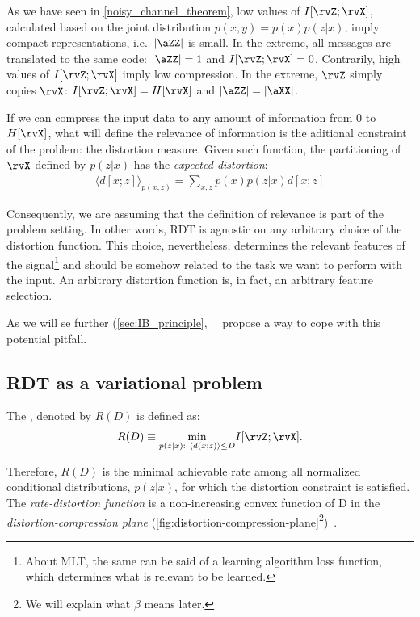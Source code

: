 As we have seen in \ref{noisy_channel_theorem}, low values of $I[\rvZ;\rvX]$, calculated based on the joint distribution $p(x,y)=p(x)p(z|x)$, imply compact representations, i.e.\ $|\aZZ|$ is small. In the extreme, all messages are translated to the same code: $|\aZZ|=1$ and $I[\rvZ;\rvX]=0$. Contrarily, high values of $I[\rvZ;\rvX]$ imply low compression.  In the extreme, $\rvZ$ simply copies $\rvX$: $I[\rvZ;\rvX]=H[\rvX]$ and $|\aZZ|=|\aXX|$.

If we can compress the input data to any amount of information from $0$ to $H[\rvX]$, what will define the relevance of information is the aditional constraint of the problem: the distortion measure. Given such function, the partitioning of $\rvX$ defined by $p(z|x)$ has the \emph{expected distortion}:
\begin{align}
	\langle d[x;z] \rangle _{p(x,z)} = \sum_{x,z} p(x) p(z|x) d[x;z]
\end{align}

Consequently, we are assuming that the definition of relevance is part of the problem setting. In other words, \ac{RDT} is agnostic on any arbitrary choice of the distortion function. This choice, nevertheless, determines the relevant features of the signal\footnote{About MLT, the same can be said of a learning algorithm loss function, which determines what is relevant to be learned.} and should be somehow related to the task we want to perform with the input. An arbitrary distortion function is, in fact, an arbitrary feature selection\cite{tishby:1999}.

As we will se further (\ref{sec:IB_principle},~\citeauthor{tishby:1999}~\cite{tishby:1999} propose a way to cope with this potential pitfall.

\subsection{\ac*{RDT} as a variational problem}\label{RDT problem}
\begin{definition}
	 The , denoted by $R(D)$ is defined as:
	 \begin{align}
		R(D) \equiv \underset{p(z|x):~ \langle d(x;z) \rangle \leq D}{\min} I[\rvZ;\rvX]. \label{rate-distortion function}
	\end{align}
\end{definition}

Therefore, $R(D)$ is the minimal achievable rate among all normalized conditional distributions, $p(z|x)$, for which the distortion constraint is satisfied. The \emph{rate-distortion function} is a non-increasing convex function of D in the \emph{distortion-compression plane} (\cref{fig:distortion-compression-plane}\footnote{We will explain what $\beta$ means later.})~\cite{cover:2006}.

